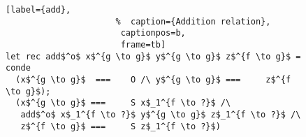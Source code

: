 \begin{figure}[!t]
  \centering
  \begin{minipage}{\columnwidth}
    \begin{lstlisting}[label={add},
                      %  caption={Addition relation},
                       captionpos=b,
                       frame=tb]
let rec add$^o$ x$^{g \to g}$ y$^{g \to g}$ z$^{f \to g}$ = conde
  (x$^{g \to g}$  ===    O /\ y$^{g \to g}$ ===     z$^{f \to g}$);
  (x$^{g \to g}$ ===     S x$_1^{f \to ?}$ /\
   add$^o$ x$_1^{f \to ?}$ y$^{g \to g}$ z$_1^{f \to ?}$ /\
   z$^{f \to g}$ ===     S z$_1^{f \to ?}$)
    \end{lstlisting}
  \end{minipage}
\end{figure}
